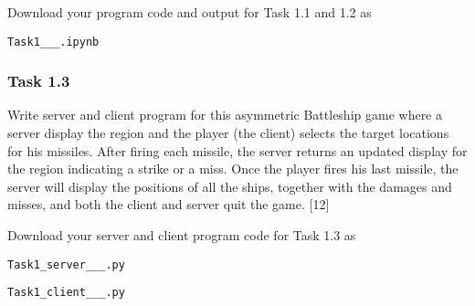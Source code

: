 Download your program code and output for Task 1.1 and 1.2 as 

\texttt{Task1\_<your name>\_<centre number>\_<index number>.ipynb}

\subsubsection*{Task 1.3}

Write server and client program for this asymmetric Battleship game
where a server display the region and the player (the client) selects
the target locations for his missiles. After firing each missile,
the server returns an updated display for the region indicating a
strike or a miss. Once the player fires his last missile, the server
will display the positions of all the ships, together with the damages
and misses, and both the client and server quit the game. \hfill{}{[}12{]}

Download your server and client program code for Task 1.3 as

\texttt{Task1\_server\_<your name>\_<centre number>\_<index number>.py }

\texttt{Task1\_client\_<your name>\_<centre number>\_<index number>.py}